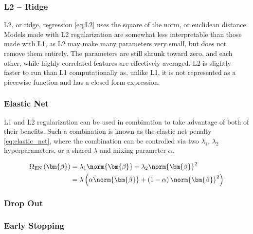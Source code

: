 \subsubsection{L2 -- Ridge}
\label{ml:general:reg:L2}
L2, or ridge, regression \cref{eq:L2} uses the square of the norm, or euclidean distance.
Models made with L2 regularization are somewhat less interpretable than those made with L1,
as L2 may make many parameters very small, but does not remove them entirely.
The parameters are still shrunk toward zero, and each other,
while highly correlated features are effectively averaged.
L2 is slightly faster to run than L1 computationally as, unlike L1, it
is not represented as a piecewise function and has a closed form expression.

\subsubsection{Elastic Net}
\label{ml:general:reg:EN}

L1 and L2 regularization can be used in combination
to take advantage of both of their benefits.
Such a combination is known as the elastic net penalty \cref{eq:elastic_net},
where the combination can be controlled via two $\lambda_{1}$, $\lambda_{2}$ hyperparameters,
or a shared $\lambda$ and mixing parameter $\alpha$.

\begin{equation} \label{eq:elastic_net}
\begin{split}
\Omega_{\text{EN}}\left(\bm{\beta}\right) &= \lambda_{1} \norm{\bm{\beta}} + \lambda_{2} \norm{\bm{\beta}}^{2}\\
&= \lambda \left( \alpha\norm{\bm{\beta}} + \left(1-\alpha\right)\norm{\bm{\beta}}^{2} \right)
\end{split}
\end{equation}


\subsubsection{Drop Out}
\label{ml:general:reg:Drop}

\subsubsection{Early Stopping}
\label{ml:general:reg:early_stopping}

